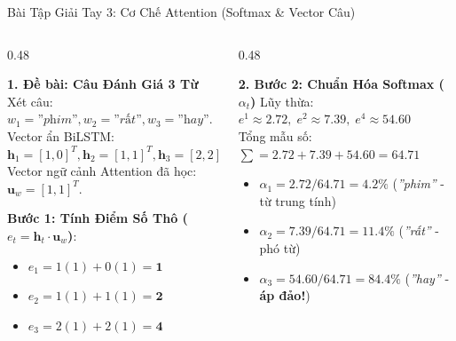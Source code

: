 \documentclass[aspectratio=169, 10pt]{beamer}
\begin{document}
\begin{frame}{Bài Tập Giải Tay 3: Cơ Chế Attention (Softmax \& Vector Câu)}
  \begin{columns}[T, onlytextwidth]
    \begin{column}{0.48\textwidth}
      \begin{block}{\small\textbf{1. Đề bài: Câu Đánh Giá 3 Từ}}
        \fontsize{7.5}{9.5}\selectfont
        Xét câu: $w_1 = \textit{''phim''}, w_2 = \textit{''rất''}, w_3 = \textit{''hay''}$.\\
        Vector ẩn BiLSTM: $\mathbf{h}_1 = [1, 0]^T, \mathbf{h}_2 = [1, 1]^T, \mathbf{h}_3 = [2, 2]^T$\\
        Vector ngữ cảnh Attention đã học: $\mathbf{u}_w = [1, 1]^T$.
        \vspace{0.05cm}
        
        \textbf{Bước 1: Tính Điểm Số Thô ($e_t = \mathbf{h}_t \cdot \mathbf{u}_w$)}:
        \begin{itemize}\setlength{\itemsep}{0.05em}
          \item $e_1 = 1(1) + 0(1) = \mathbf{1}$
          \item $e_2 = 1(1) + 1(1) = \mathbf{2}$
          \item $e_3 = 2(1) + 2(1) = \mathbf{4}$
        \end{itemize}
      \end{block}
    \end{column}
    \hfill
    \begin{column}{0.48\textwidth}
      \begin{exampleblock}{\small\textbf{2. Bước 2: Chuẩn Hóa Softmax ($\alpha_t$)}}
        \fontsize{7.5}{9.5}\selectfont
        Lũy thừa: $e^1 \approx 2.72, \; e^2 \approx 7.39, \; e^4 \approx 54.60$\\
        Tổng mẫu số: $\sum = 2.72 + 7.39 + 54.60 = \mathbf{64.71}$
        \begin{itemize}\setlength{\itemsep}{0.05em}
          \item $\alpha_1 = 2.72 / 64.71 = \mathbf{4.2\%}$ (\textit{''phim''} - từ trung tính)
          \item $\alpha_2 = 7.39 / 64.71 = \mathbf{11.4\%}$ (\textit{''rất''} - phó từ)
          \item $\alpha_3 = 54.60 / 64.71 = \mathbf{84.4\%}$ (\textit{''hay''} - \textbf{áp đảo!})
        \end{itemize}
      \end{exampleblock}
    \end{column}
  \end{columns}


\end{frame}
\end{document}
